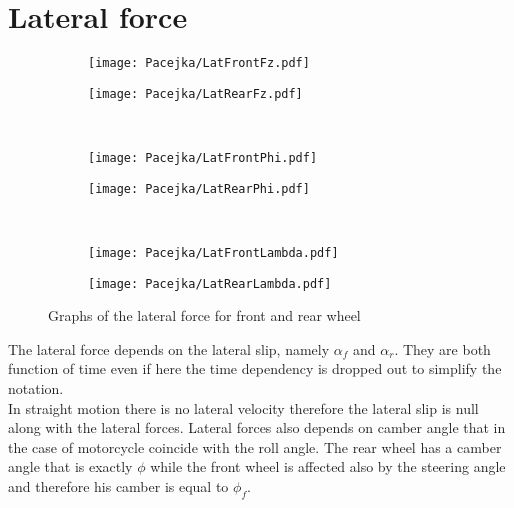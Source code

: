 \section{Lateral force}
%
\begin{figure}%
    \begin{subfigure}{.5\textwidth}
        \texttt{[image: Pacejka/LatFrontFz.pdf]}
        \caption{}
        \label{fig:lat1a}
    \end{subfigure}%
    \begin{subfigure}{.5\textwidth}
        \texttt{[image: Pacejka/LatRearFz.pdf]}
        \caption{}
        \label{fig:lat1b}
    \end{subfigure}\\
    \begin{subfigure}{.5\textwidth}
        \texttt{[image: Pacejka/LatFrontPhi.pdf]}
        \caption{}
        \label{fig:lat1c}
    \end{subfigure}%
    \begin{subfigure}{.5\textwidth}
        \texttt{[image: Pacejka/LatRearPhi.pdf]}
        \caption{}
        \label{fig:lat1d}
    \end{subfigure}\\
    \begin{subfigure}{.5\textwidth}
        \texttt{[image: Pacejka/LatFrontLambda.pdf]}
        \caption{}
        \label{fig:lat1e}
    \end{subfigure}%
    \begin{subfigure}{.5\textwidth}
        \texttt{[image: Pacejka/LatRearLambda.pdf]}
        \caption{}
        \label{fig:lat1f}
    \end{subfigure}
    \caption{Graphs of the lateral force for front and rear wheel}
\end{figure}
%
%
The lateral force depends on the lateral slip, namely $\alpha_f$ and $\alpha_r$. They are both function of time even if here the time dependency is dropped out to simplify the notation.\\
In straight motion there is no lateral velocity therefore the lateral slip is null along with the lateral forces. Lateral forces also depends on camber angle that in the case of motorcycle coincide with the roll angle. The rear wheel has a camber angle that is exactly $\phi$ while the front wheel is affected also by the steering angle and therefore his camber is equal to $\phi_f$.\\ 
